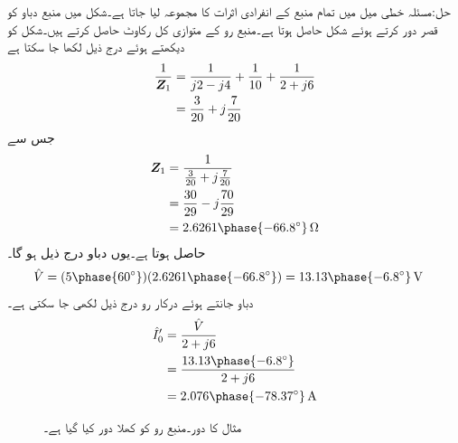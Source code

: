 حل:مسئلہ خطی میل میں تمام منبع کے انفرادی اثرات کا مجموعہ لیا جاتا ہے۔شکل  میں منبع دباو کو قصر دور کرتے ہوئے  شکل  حاصل ہوتا ہے۔منبع رو کے متوازی کل رکاوٹ  حاصل کرتے ہیں۔شکل کو دیکھتے ہوئے درج ذیل لکھا جا سکتا ہے
\begin{align*}
\frac{1}{{{\boldsymbol{Z}}}_1}&=\frac{1}{j2-j4}+\frac{1}{10}+\frac{1}{2+j6}\\
&=\frac{3}{20}+j\frac{7}{20}
\end{align*}
جس سے
\begin{align*}
\bZ_1&=\frac{1}{\frac{3}{20}+j\frac{7}{20}}\\
&=\frac{30}{29}-j\frac{70}{29}\\
&=2.6261\phase{-66.8^{\circ}} \, \si{\ohm}
\end{align*}
حاصل ہوتا ہے۔یوں دباو  درج ذیل ہو گا۔
\begin{align*}
\hat{V}&=(5\phase{60^{\circ}})(2.6261\phase{-66.8^{\circ}})=13.13\phase{-6.8^{\circ}}\,\si{\volt} 
\end{align*}
دباو جانتے ہوئے درکار رو درج ذیل لکھی جا سکتی ہے۔
\begin{gather}
\begin{aligned}\label{مساوات-بدلتا_منبع_رو_کی_رو}
\hat{I}'_0&=\frac{\hat{V}}{2+j6}\\
&=\frac{13.13\phase{-6.8^{\circ}}}{2+j6}\\
&=2.076\phase{-78.37^{\circ}} \, \si{\ampere}
\end{aligned}
\end{gather}
%
\begin{figure}
\centering
{}
\caption{مثال  کا دور۔منبع رو کو کھلا دور کیا گیا ہے۔}
\label{شکل_بدلتا_تراکیب_ت}
\end{figure}

